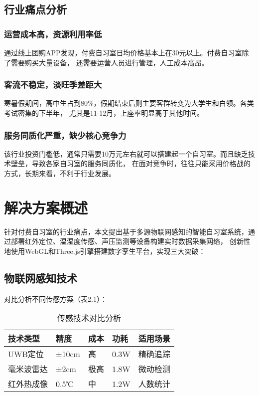 \documentclass[12pt,a4paper]{IEEEtran} %
\begin{document}
\subsection{行业痛点分析}
\subsubsection{运营成本高，资源利用率低}
通过线上团购APP发现，付费自习室日均价格基本上在30元以上。付费自习室除了需要购买大量设备，
还需要运营人员进行管理，人工成本高昂。
\subsubsection{客流不稳定，淡旺季差距大}
寒暑假期间，高中生占到80\%，假期结束后则主要客群转变为大学生和白领。各类考试密集的下半年，
尤其是11-12月，上座率明显高于其他时间\cite{ZJTG202211023}。
\subsubsection{服务同质化严重，缺少核心竞争力}
该行业投资门槛低，通常只需要10万元左右就可以搭建起一个自习室。而且缺乏技术壁垒，导致各家自习室的服务同质化，
在面对竞争时，往往只能采用价格战的方式，长期来看，不利于行业发展。
\section{解决方案概述}
针对付费自习室的行业痛点，本文提出基于多源物联网感知的智能自习室系统，通过部署红外定位、温湿度传感、声压监测等设备构建实时数据采集网络，
创新性地使用WebGL和Three.js引擎搭建数字孪生平台，实现三大突破：
\subsection{物联网感知技术}
对比分析不同传感方案（表2.1）：
\begin{table}[htbp]
  \caption{传感技术对比分析}
  \begin{tabularx}{\linewidth}{lXXXX}
    \toprule
    技术类型  & 精度    & 成本 & 功耗   & 适用场景 \\
    \midrule
    UWB定位 & ±10cm & 高  & 0.3W & 精确追踪 \\
    毫米波雷达 & ±2cm  & 极高 & 1.8W & 微动检测 \\
    红外热成像 & 0.5℃  & 中  & 1.2W & 人数统计 \\
    \bottomrule
  \end{tabularx}
\end{table}
\end{document}
